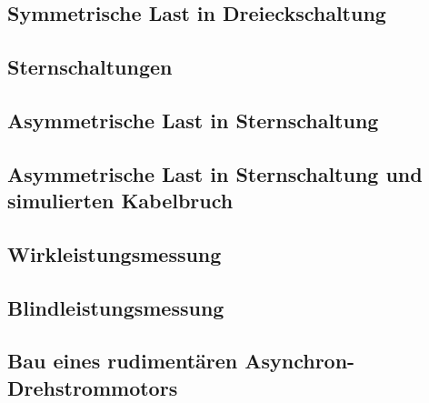 \documentclass[12pt,english,ngerman]{scrartcl}
\begin{document}
\subsection{Symmetrische Last in Dreieckschaltung}

\subsection{Sternschaltungen}

\subsection{Asymmetrische Last in Sternschaltung}

\subsection{Asymmetrische Last in Sternschaltung und simulierten Kabelbruch}

\subsection{Wirkleistungsmessung}

\subsection{Blindleistungsmessung}

\subsection{Bau eines rudimentären Asynchron-Drehstrommotors}

\newpage

\listoffigures
\listoftables
\end{document}
